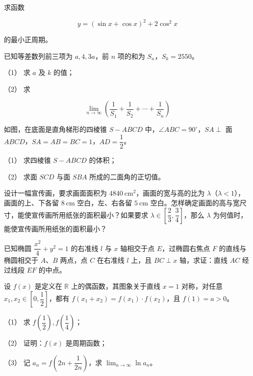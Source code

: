 \begin{question}
求函数

\nopagebreak[4]
\[
y=(\sin x+\cos x)^2+2\cos^2x
\]

的最小正周期。

\end{question}
\begin{question}
已知等差数列前三项为 $a,4,3a$，前 $n$ 项的和为 $S_n$，$S_k=2550$。

（1） 求 $a$ 及 $k$ 的值；

（2） 求

\nopagebreak[4]
\[
\lim_{n\to\infty}\left(\frac1{S_1}+\frac1{S_2}+\cdots+\frac1{S_n}\right)
\]

\Needspace{0.4\textheight}
\end{question}
\begin{question}
如图，在底面是直角梯形的四棱锥 $S-ABCD$ 中，$\angle ABC=90^\circ$，$SA\perp$ 面 $ABCD$，$SA=AB=BC=1$，$AD=\dfrac12$。
\nopagebreak[4]
\begin{center}\end{center}
\nopagebreak[4]
（1） 求四棱锥 $S-ABCD$ 的体积；

（2） 求面 $SCD$ 与面 $SBA$ 所成的二面角的正切值。

\end{question}
\begin{question}
设计一幅宣传画，要求画面面积为 $4840\ \mathrm{cm}^2$，画面的宽与高的比为 $\lambda$（$\lambda<1$），画面的上、下各留 $8\ \mathrm{cm}$ 空白，左、右各留 $5\ \mathrm{cm}$ 空白。怎样确定画面的高与宽尺寸，能使宣传画所用纸张的面积最小？如果要求 $\lambda\in\left[\dfrac23,\dfrac34\right]$，那么 $\lambda$ 为何值时，能使宣传画所用纸张的面积最小？

\end{question}
\begin{question}
已知椭圆 $\dfrac{x^2}{4}+y^2=1$ 的右准线 $l$ 与 $x$ 轴相交于点 $E$，过椭圆右焦点 $F$ 的直线与椭圆相交于 $A\text{、}B$ 两点，点 $C$ 在右准线 $l$ 上，且 $BC\perp x$ 轴，求证：直线 $AC$ 经过线段 $EF$ 的中点。

\end{question}
\begin{question}
设 $f(x)$ 是定义在 $\mathbb R$ 上的偶函数，其图象关于直线 $x=1$ 对称，对任意 $x_1,x_2\in\left[0,\dfrac12\right]$，都有 $f(x_1+x_2)=f(x_1)\cdot f(x_2)$，且 $f(1)=a>0$。

（1） 求 $f\left(\dfrac12\right),f\left(\dfrac14\right)$；

（2） 证明：$f(x)$ 是周期函数；

（3） 记 $a_n=f\left(2n+\dfrac1{2n}\right)$，求 $\displaystyle\lim_{n\to\infty}\ln a_n$。

\end{question}
